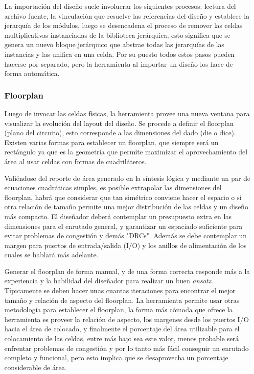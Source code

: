 La importación del diseño suele involucrar los siguientes procesos: lectura del archivo fuente, la vinculación que resuelve las referencias del diseño y establece la jerarquía de los módulos, luego se desencadena el proceso de remover las celdas multiplicativas instanciadas de la biblioteca jerárquica, esto significa que se genera un nuevo bloque jerárquico que abstrae todas las jerarquías de las instancias y las unifica en una celda. Por su puesto todos estos pasos pueden hacerse por separado, pero la herramienta al importar un diseño los hace de forma automática.

\subsubsection{Floorplan}

Luego de invocar las celdas físicas, la herramienta provee una nueva ventana para visualizar la evolución del layout del diseño. Se procede a definir el floorplan (plano del circuito), esto corresponde a las dimensiones del dado (die o dice). Existen varias formas para establecer un floorplan, que siempre será un rectángulo ya que es la geometría que permite maximizar el aprovechamiento del área al usar celdas con formas de cuadriláteros.

Valiéndose del reporte de área generado en la síntesis lógica y mediante un par de ecuaciones cuadráticas simples, es posible extrapolar las dimensiones del floorplan, habrá que considerar que tan simétrico conviene hacer el espacio o si otra relación de tamaño permite una mejor distribución de las celdas y un diseño más compacto. El diseñador deberá contemplar un presupuesto extra en las dimensiones para el enrutado general, y garantizar un espaciado suficiente para evitar problemas de congestión y demás "DRCs". Además se debe contemplar un margen para puertos de entrada/salida (I/O) y los anillos de alimentación de los cuales se hablará más adelante.

Generar el floorplan de forma manual, y de una forma correcta responde más a la experiencia y la habilidad del diseñador para realizar un buen \textit{ansatz}. Típicamente se deben hacer unas cuantas iteraciones para encontrar el mejor tamaño y relación de aspecto del floorplan. La herramienta permite usar otras metodología para establecer el floorplan, la forma más cómoda que ofrece la herramienta es proveer la relación de aspecto, los margenes desde los puertos I/O hacia el área de colocado, y finalmente el porcentaje del área utilizable para el colocamiento de las celdas, entre más bajo sea este valor, menos probable será enfrentar problemas de congestión y por lo tanto más fácil conseguir un enrutado completo y funcional, pero esto implica que se desaprovecha un porcentaje considerable de área.

